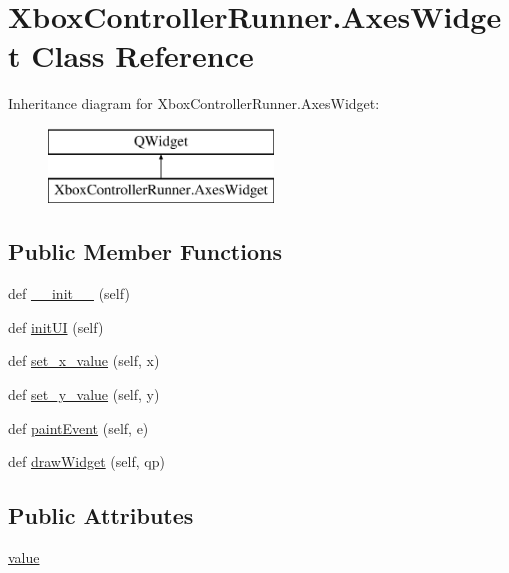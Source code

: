 \hypertarget{class_xbox_controller_runner_1_1_axes_widget}{}\section{Xbox\+Controller\+Runner.\+Axes\+Widget Class Reference}
\label{class_xbox_controller_runner_1_1_axes_widget}
Inheritance diagram for Xbox\+Controller\+Runner.\+Axes\+Widget\+:\begin{figure}[H]
\begin{center}
\leavevmode
\includegraphics[height=2.000000cm]{class_xbox_controller_runner_1_1_axes_widget}
\end{center}
\end{figure}
\subsection*{Public Member Functions}
\begin{DoxyCompactItemize}
\item 
def \mbox{\hyperlink{class_xbox_controller_runner_1_1_axes_widget_a8ae5f6ee023fcdb5f33229f32242657f}{\+\_\+\+\_\+init\+\_\+\+\_\+}} (self)
\item 
def \mbox{\hyperlink{class_xbox_controller_runner_1_1_axes_widget_ab5824aeff9ffdd5f4280a576c26ff72a}{init\+UI}} (self)
\item 
def \mbox{\hyperlink{class_xbox_controller_runner_1_1_axes_widget_a97aa9bbf6ef8690c5a1c4a6f69ce85ff}{set\+\_\+x\+\_\+value}} (self, x)
\item 
def \mbox{\hyperlink{class_xbox_controller_runner_1_1_axes_widget_a39985b05c5647b717e8868d35cae01aa}{set\+\_\+y\+\_\+value}} (self, y)
\item 
def \mbox{\hyperlink{class_xbox_controller_runner_1_1_axes_widget_a9689ba86692377eb219bb3f0fa5ad2e8}{paint\+Event}} (self, e)
\item 
def \mbox{\hyperlink{class_xbox_controller_runner_1_1_axes_widget_adba705012381f09a85512c77f43c71ca}{draw\+Widget}} (self, qp)
\end{DoxyCompactItemize}
\subsection*{Public Attributes}
\begin{DoxyCompactItemize}
\item 
\mbox{\hyperlink{class_xbox_controller_runner_1_1_axes_widget_a9bfe6a694135e62de289e4d58caa2f3c}{value}}
\end{DoxyCompactItemize}


